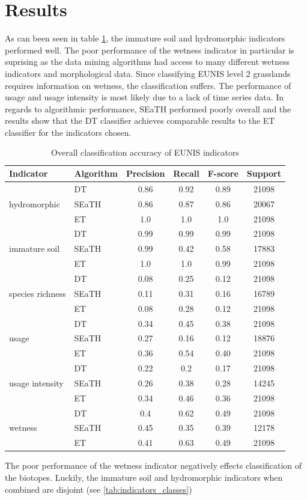 \documentclass[authoryear, review,12pt,number]{elsarticle}
\begin{document}
{\section{Results}
As can been seen in table \ref{tab:accuracy_indicators}, the immature soil and
hydromorphic indicators performed well. The poor performance of the wetness
indicator in particular is suprising as the data mining algorithms had access to
many different wetness indicators and morphological data. Since classifying
EUNIS level 2 grasslands requires information on wetness, the classification
suffers. The performance of usage and usage intensity is most likely due to a
lack of time series data. In regards to algorithmic performance, SEaTH
performed poorly overall and the results show that the DT classifier achieves
comparable results to the ET classifier for the indicators chosen. 
\begin{table}
    \centering
    \begin{tabular}{l l c c c c}
    Indicator & Algorithm & Precision & Recall & F-score & 
    Support\\
    \hline
    \multirow{3}{*}{hydromorphic}
    & DT & 0.86 & 0.92 & 0.89 & 21098\\
    & SEaTH & 0.86 & 0.87 & 0.86 & 20067\\
    & ET & 1.0 & 1.0 & 1.0 & 21098\\
    \cline{2-6}
    \multirow{3}{*}{immature soil}
    & DT & 0.99 & 0.99 & 0.99 & 21098\\
    & SEaTH & 0.99 & 0.42 & 0.58 & 17883\\
    & ET & 1.0 & 1.0 & 0.99 & 21098\\
    \cline{2-6}
    \multirow{3}{*}{species richness}
    & DT & 0.08 & 0.25 & 0.12 & 21098\\
    & SEaTH & 0.11 & 0.31 & 0.16 & 16789\\
    & ET & 0.08 & 0.28 & 0.12 & 21098\\
    \cline{2-6}
    \multirow{3}{*}{usage}
    & DT & 0.34 & 0.45 & 0.38 & 21098\\
    & SEaTH & 0.27 & 0.16 & 0.12 & 18876\\
    & ET & 0.36 & 0.54 & 0.40 & 21098\\
    \cline{2-6}
    \multirow{3}{*}{usage intensity}
    & DT & 0.22 & 0.2 & 0.17 & 21098\\
    & SEaTH & 0.26 & 0.38 & 0.28 & 14245\\
    & ET & 0.34 & 0.46 & 0.36 & 21098\\
    \cline{2-6}
    \multirow{3}{*}{wetness}
    & DT & 0.4 & 0.62 & 0.49 & 21098\\
    & SEaTH & 0.45 & 0.35 & 0.39 & 12178\\
    & ET & 0.41 & 0.63 & 0.49 & 21098\\
    \end{tabular}
    \label{tab:classification_EUNIS}
    \caption{Overall classification accuracy of EUNIS indicators}
    \label{tab:accuracy_indicators}
\end{table}
The poor performance of the wetness indicator negatively effects classification of the
biotopes. Luckily, the immature soil and hydromorphic indicators when combined
are disjoint (see \ref{tab:indicators_classes})
}
\end{document}
